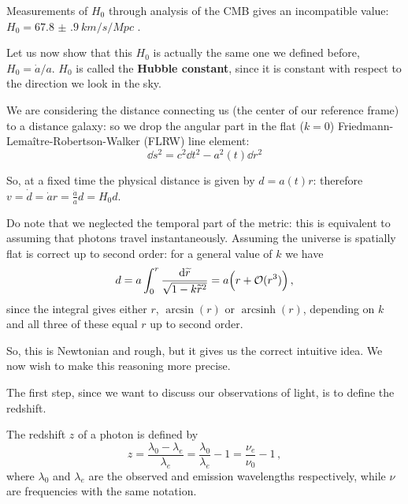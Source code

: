 \documentclass[main.tex]{subfiles}
\begin{document}
Measurements of \(H_0 \) through analysis of the CMB gives an incompatible value: \(H_0 = \SI{67.8(9)}{km/s/Mpc}\) \cite{PlanckCollaboration:2016XIII}.


Let us now show that this \(H_0 \) is actually the same one we defined before, \(H_0 = \dot{a} / a\).
\(H_0 \) is called the \textbf{Hubble constant}, since it is constant with respect to the direction we look in the sky.


We are considering the distance connecting us (the center of our reference frame) to a distance galaxy: so we drop the angular part in the flat (\(k = 0\)) Friedmann-Lemaître-Robertson-Walker (FLRW) line element:
%
\begin{equation}
  \dd{s^2} = c^2 \dd{t^2} - a^2(t) \dd{r^2}
\end{equation}

So, at a fixed time the physical distance is given by \(d = a(t) r\): therefore \(v = \dot{d} = \dot{a}r = \frac{\dot{a} }{a} d = H_0 d\). 

Do note that we neglected the temporal part of the metric: this is equivalent to assuming that photons travel instantaneously.
Assuming the universe is spatially flat is correct up to second order: for a general value of \(k\) we have 
%
\begin{align}
d = a \int_{0}^{r} \frac{ \dd{\widetilde{r}} }{\sqrt{1 - k \widetilde{r}^2}} = a  \qty( r + \mathcal{O}(r^3))
\,,
\end{align}
%
since the integral gives either \(r\), \(\arcsin(r)\) or \(\operatorname{arcsinh}(r)\), depending on \(k\) and all three of these equal \(r\) up to second order.

So, this is Newtonian and rough, but it gives us the correct intuitive idea.
We now wish to make this reasoning more precise.

The first step, since we want to discuss our observations of light, is to define the redshift.

\begin{definition}[Redshift]
The redshift \(z\) of a photon is defined by
%
\begin{equation}
  z = \frac{\lambda_0 - \lambda_e}{\lambda_{e}}
  = \frac{\lambda_0 }{\lambda_{e}} - 1
  = \frac{\nu_{e}}{\nu_{0}} - 1
  \,,
\end{equation}
%
where \(\lambda_0\) and \(\lambda_e\) are the observed and emission wavelengths respectively, while \(\nu \) are frequencies with the same notation.
\end{definition}
\end{document}

